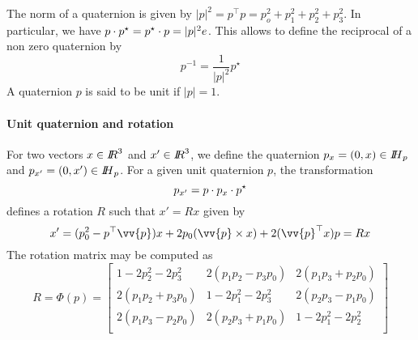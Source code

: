 The norm of a quaternion is given by $|p|^2=p^\top p = p_o^2+p_1^2+p_2^2+p_3^2$. In particular, we have $p \cdot p^\star = p^\star \cdot p = |p|^2 e$. This allows to define the reciprocal of a non zero quaternion by
\begin{equation}
  \label{eq:78}
  p ^{-1} = \frac 1 {|p|^2} p^\star
\end{equation}
A quaternion $p$ is said to be unit if $|p| =1$. 

\paragraph{Unit quaternion and rotation}
For two vectors $x\in \mbox{\rm $I\!\!R$}^3$ and $x'\in \mbox{\rm $I\!\!R$}^3$, we define the quaternion $p_x = (0,x)\in \mbox{\rm $I\!\!H$}_p$ and  $p_{x'} = (0,x')\in \mbox{\rm $I\!\!H$}_p$.
For a given unit quaternion $p$, the transformation
\begin{equation}
  \label{eq:79}
  p_{x'} = p \cdot p_x \cdot  p^\star 
\end{equation}
defines a rotation $R$ such that $x'  = R x$ given by
\begin{equation}
  \label{eq:80}
  x' = (p_0^2- p^\top \vv{p}) x +2 p_0(\vv{p}\times x) +  2 (\vv{p}^\top x) p = R x
\end{equation}
The rotation matrix may be computed as 
\begin{equation}
  \label{eq:81}
  R = \Phi(p) =
  \begin{bmatrix}
    1-2 p_2^2- 2 p_3^2 & 2(p_1p_2-p_3p_0) & 2(p_1p_3+p_2p_0)\\
    2(p_1p_2+p_3p_0) & 1-2 p_1^2- 2 p_3^2 & 2(p_2p_3-p_1p_0)\\
    2(p_1p_3-p_2p_0) & 2(p_2p_3+p_1p_0)  & 1-2 p_1^2- 2 p_2^2\\
  \end{bmatrix}
\end{equation} 


